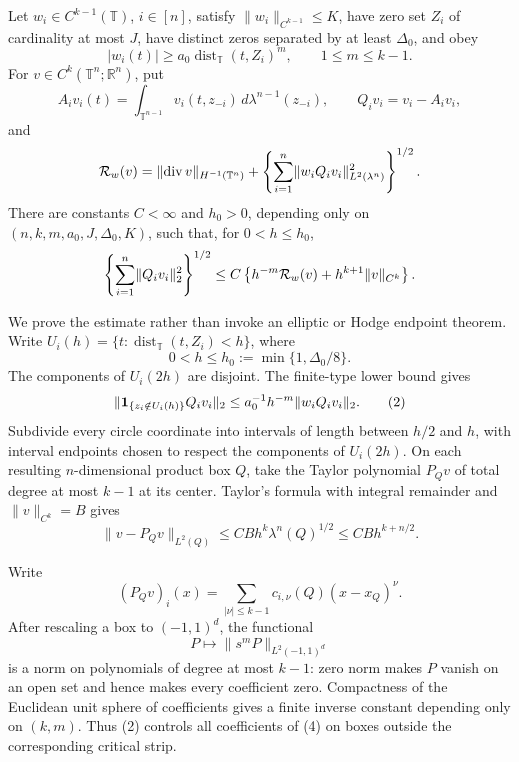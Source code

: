 Let \(w_i\in C^{k-1}(\mathbb T)\), \(i\in[n]\), satisfy \(\lVert w_i\rVert_{C^{k-1}}\leq K\), have zero set \(Z_i\) of cardinality at most \(J\), have distinct zeros separated by at least \(\Delta _0\), and obey
\[
 |w_i(t)|\geq a_0\operatorname {dist}_{\mathbb T}(t,Z_i)^m,
 \qquad 1\leq m\leq k-1.
\]
For \(v\in C^k(\mathbb T^n;\mathbb R^n)\), put
\[
 A_i v_i(t)=\int_{\mathbb T^{n-1}}v_i(t,z_{-i})\,d\lambda^{n-1}(z_{-i}),
 \qquad Q_i v_i=v_i-A_i v_i,
\]
and
\[
 {\cal R}_w(v)=\lVert\operatorname {div}v\rVert_{H^{-1}(\mathbb T^n)}+
 \left\{\sum_{i=1}^n\lVert w_iQ_iv_i\rVert_{L^2(\lambda^n)}^2\right\}^{1/2}.
\]
There are constants \(C<\infty\) and \(h_0>0\), depending only on \((n,k,m,a_0,J,\Delta _0,K)\), such that, for \(0<h\leq h_0\),
\[
 \left\{\sum_{i=1}^n\lVert Q_iv_i\rVert_2^2\right\}^{1/2}
 \leq C\left\{h^{-m}{\cal R}_w(v)+h^{k+1}\lVert v\rVert_{C^k}\right\}.
\]

We prove the estimate rather than invoke an elliptic or Hodge endpoint theorem.  Write \(U_i(h)=\{t:\operatorname {dist}_{\mathbb T}(t,Z_i)<h\}\), where
\[
 0<h\leq h_0:=\min\{1,\Delta _0/8\}.
\tag{1}
\]
The components of \(U_i(2h)\) are disjoint.  The finite-type lower bound gives
\[
 \lVert {\bf1}_{\{z_i\notin U_i(h)\}}Q_iv_i\rVert_2
 \leq a_0^{-1}h^{-m}\lVert w_iQ_iv_i\rVert_2.
\tag{2}
\]
Subdivide every circle coordinate into intervals of length between \(h/2\) and \(h\), with interval endpoints chosen to respect the components of \(U_i(2h)\).  On each resulting \(n\)-dimensional product box \(Q\), take the Taylor polynomial \(P_Qv\) of total degree at most \(k-1\) at its center.  Taylor's formula with integral remainder and \(\lVert v\rVert_{C^k}=B\) gives
\[
 \lVert v-P_Qv\rVert_{L^2(Q)}
 \leq C B h^k\lambda^n(Q)^{1/2}
 \leq C B h^{k+n/2}.
\tag{3}
\]

Write
\[
 (P_Qv)_i(x)=\sum_{|\nu|\leq k-1}c_{i,\nu}(Q)(x-x_Q)^\nu.
\tag{4}
\]
After rescaling a box to \((-1,1)^d\), the functional
\[
 P\longmapsto \lVert s^mP\rVert_{L^2(-1,1)^d}
\tag{5}
\]
is a norm on polynomials of degree at most \(k-1\): zero norm makes \(P\) vanish on an open set and hence makes every coefficient zero.  Compactness of the Euclidean unit sphere of coefficients gives a finite inverse constant depending only on \((k,m)\).  Thus (2) controls all coefficients of (4) on boxes outside the corresponding critical strip.

